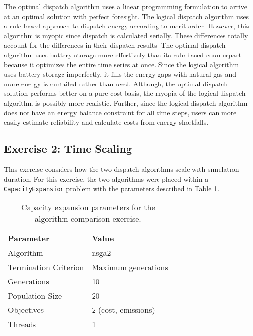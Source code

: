 The optimal dispatch algorithm uses a linear programming formulation to arrive
at an optimal solution with perfect foresight. The logical dispatch algorithm
uses a rule-based approach to dispatch energy according to merit order.
However, this algorithm is myopic since dispatch is calculated serially. These
differences totally account for the differences in their dispatch results. The
optimal dispatch algorithm uses battery storage more effectively than its
rule-based counterpart because it optimizes the entire time series at once.
Since the logical algorithm uses battery storage imperfectly, it fills the
energy gaps with natural gas and more energy is curtailed rather than used.
Although, the optimal dispatch solution performs better on a pure cost basis, the
myopia of the logical dispatch algorithm is possibly more realistic.
Further, since the logical dispatch algorithm does not have an energy balance
constraint for all time steps, users can more easily estimate reliability and
calculate costs from energy shortfalls.


\FloatBarrier

\subsection{Exercise 2: Time Scaling}

This exercise considers how the two dispatch algorithms scale with simulation duration.
For this exercise, the two algorithms were placed within a
\texttt{CapacityExpansion} problem with the parameters described in Table
\ref{tab:scaling-ga-params}.

\begin{table}[htbp!]
    \centering
    \caption{Capacity expansion parameters for the algorithm comparison exercise.}
    \label{tab:scaling-ga-params}
    \begin{tabular}{ll}
        \toprule
        Parameter & Value \\
        \midrule
        Algorithm & \acs{nsga2}\\
        Termination Criterion & Maximum generations\\
        Generations & 10 \\
        Population Size & 20 \\
        Objectives & 2 (cost, emissions)\\
        Threads & 1 \\
        \bottomrule
    \end{tabular}
\end{table}

